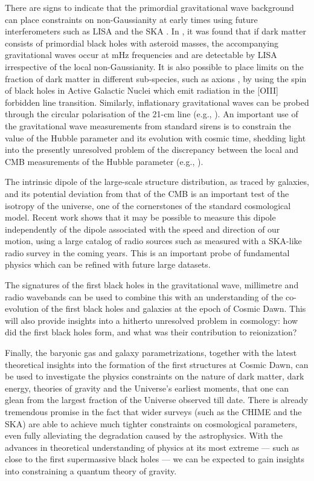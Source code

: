 There are signs to indicate that the primordial gravitational wave background can place constraints on non-Gaussianity at early times using future interferometers such as LISA and the SKA \cite{unal2019}. In \cite{cai2019}, it was found that if dark matter consists of primordial black holes with asteroid masses, the accompanying gravitational waves occur at mHz frequencies and are detectable by LISA irrespective of the local non-Gaussianity. It is also possible to place limits on the fraction of dark matter in different sub-species, such as axions \cite{unal2020}, by using the spin of black holes in Active Galactic Nuclei which emit radiation in the [OIII] forbidden line transition. Similarly, inflationary gravitational waves can be probed through the circular polarisation of the 21-cm line (e.g., \cite{mishra2018}). An important use of the gravitational wave measurements from standard sirens is to constrain the value of the Hubble parameter and its evolution with cosmic time, shedding light into the presently unresolved problem of the discrepancy between the local and CMB measurements of the Hubble parameter (e.g., \cite{Riess_2019}).

The intrinsic dipole of the large-scale structure distribution, as traced by galaxies, and its potential deviation from that of the CMB is an important test of the isotropy of the universe, one of the cornerstones of the standard cosmological model. Recent work \cite{nadolny2021} shows that it may be possible to measure this dipole independently of the dipole associated with the speed and direction of our motion,  using a large catalog of radio sources such as measured with a SKA-like radio survey in the coming years. This is an important probe of fundamental physics which can be refined with future large datasets.

The signatures of the first black holes in the gravitational wave, millimetre and radio wavebands can be used to combine this with an understanding of the co-evolution of the first black holes and galaxies at the epoch of Cosmic Dawn. This will also provide insights into a hitherto unresolved problem in cosmology: how did the first black holes form, and what was their contribution to reionization?

Finally, the baryonic gas and galaxy parametrizations, together with the latest theoretical insights into the formation of the first structures at Cosmic Dawn, can be used to investigate the physics constraints on the nature of dark matter, dark energy, theories of gravity and the Universe’s earliest moments, that one can glean from the largest fraction of the Universe observed till date. There is already tremendous promise in the fact that wider surveys (such as the CHIME and the SKA) are able to achieve much tighter constraints on cosmological parameters, even fully alleviating the degradation caused by the astrophysics. With the advances in theoretical understanding of physics at its most extreme — such as close to the first supermassive black holes — we can be expected to gain insights into constraining a quantum theory of gravity.




